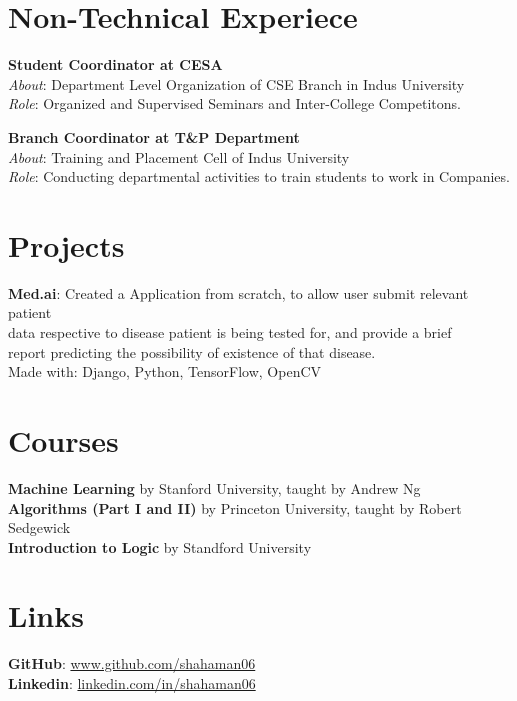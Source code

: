 \documentclass[margin, centered]{res}
\begin{document}
\begin{resume}
		\section{Non-Technical Experiece}
			\textbf{Student Coordinator at CESA}\\
			\textit{About}: Department Level Organization of CSE Branch in Indus University\\
			\textit{Role}: Organized and Supervised Seminars and Inter-College Competitons.
			\par
			\textbf{Branch Coordinator at T\&P Department}\\
			\textit{About}: Training and Placement Cell of Indus University\\
			\textit{Role}: Conducting departmental activities to train students to work in Companies.
		
		\section{Projects}
			\textbf{Med.ai}:
			Created a Application from scratch, to allow user submit relevant patient \\data respective to disease patient is being tested for, and provide a brief \\report predicting the possibility of existence of that disease.
			\\Made with: Django, Python, TensorFlow, OpenCV
		
		\section{Courses}
			\textbf{Machine Learning} by Stanford University, taught by Andrew Ng\\
			\textbf{Algorithms (Part I and II)} by Princeton University, taught by Robert Sedgewick\\
			\textbf{Introduction to Logic} by Standford University
		
		\section{Links}
			\textbf{GitHub}: \href{https://github.com/shahaman06}{www.github.com/shahaman06}
			\\
			\textbf{Linkedin}: \href{https://www.linkedin.com/in/shahaman06/}{linkedin.com/in/shahaman06}
	\end{resume}
	
\end{document}

